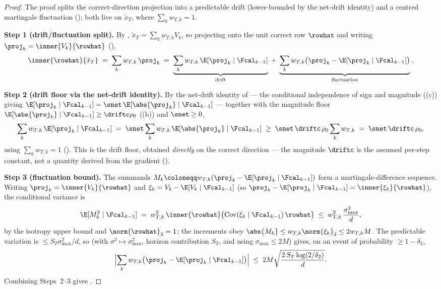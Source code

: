 \begin{proof}
The proof splits the correct-direction projection into a predictable drift
(lower-bounded by the net-drift identity) and a centred martingale
fluctuation (); both live on $\tilde x_T$, where
$\sum_k w_{T,k}=1$.

\smallskip\noindent\textbf{Step 1 (drift/fluctuation split).} By
, $\tilde x_T=\sum_{k}w_{T,k}V_k$, so projecting
onto the unit correct row $\rowhat$ and writing
$\proj_k=\inner{V_k}{\rowhat}$ (),
\begin{align*}
   \inner{\rowhat}{\tilde x_T}
   \;=\; \sum_{k} w_{T,k}\,\proj_k
   \;=\; \underbrace{\sum_{k} w_{T,k}\,\E[\proj_k\mid\Fcal_{k-1}]}_{\text{drift}}
       \;+\; \underbrace{\sum_{k} w_{T,k}\bigl(\proj_k-\E[\proj_k\mid\Fcal_{k-1}]\bigr)}_{\text{fluctuation}}.
\end{align*}

\smallskip\noindent\textbf{Step 2 (drift floor via the net-drift identity).}
By the net-drift identity  of 
--- the conditional independence of sign and magnitude
((c)) giving
$\E[\proj_k\mid\Fcal_{k-1}]=\snet\,\E[\abs{\proj_k}\mid\Fcal_{k-1}]$ ---
together with the magnitude floor $\E[\abs{\proj_k}\mid\Fcal_{k-1}]\ge\driftc\rho_0$
((b)) and $\snet\ge0$,
\begin{align*}
   \sum_{k} w_{T,k}\,\E[\proj_k\mid\Fcal_{k-1}]
   \;=\; \snet\sum_k w_{T,k}\,\E[\abs{\proj_k}\mid\Fcal_{k-1}]
   \;\ge\; \snet\,\driftc\,\rho_0\sum_k w_{T,k}
   \;=\; \snet\,\driftc\,\rho_0,
\end{align*}
using $\sum_k w_{T,k}=1$ (). This is the drift
floor, obtained \emph{directly} on the correct direction --- the magnitude
$\driftc$ is the assumed per-step constant, not a quantity derived from the
gradient ().

\smallskip\noindent\textbf{Step 3 (fluctuation bound).} The summands
$M_k\coloneqq w_{T,k}(\proj_k-\E[\proj_k\mid\Fcal_{k-1}])$ form a
martingale-difference sequence. Writing $\proj_k=\inner{V_k}{\rowhat}$ and
$\xi_k=V_k-\E[V_k\mid\Fcal_{k-1}]$ (so
$\proj_k-\E[\proj_k\mid\Fcal_{k-1}]=\inner{\xi_k}{\rowhat}$), the
conditional variance is
\begin{align*}
   \E[M_k^2\mid\Fcal_{k-1}]
   \;=\; w_{T,k}^2\,\inner{\rowhat}{\operatorname{Cov}(\xi_k\mid\Fcal_{k-1})\,\rowhat}
   \;\le\; w_{T,k}^2\,\frac{\sigma_{\max}^2}{d},
\end{align*}
by the isotropy upper bound  and
$\norm{\rowhat}_2=1$; the increments obey
$\abs{M_k}\le w_{T,k}\norm{\xi_k}_2\le2w_{T,k}M$. The predictable variation
is $\le S_T\sigma_{\max}^2/d$, so  (with
$\sigma^2\mapsto\sigma_{\max}^2$, horizon contribution $S_T$, and using
$\sigma_{\max}\le2M$) gives, on an event of probability $\ge1-\delta_2$,
\begin{align*}
   \Bigl|\sum_k w_{T,k}\bigl(\proj_k-\E[\proj_k\mid\Fcal_{k-1}]\bigr)\Bigr|
   \;\le\; 2M\sqrt{\frac{2\,S_T\log(2/\delta_2)}{d}}.
\end{align*}
Combining Steps~2--3 gives .


\end{proof}
